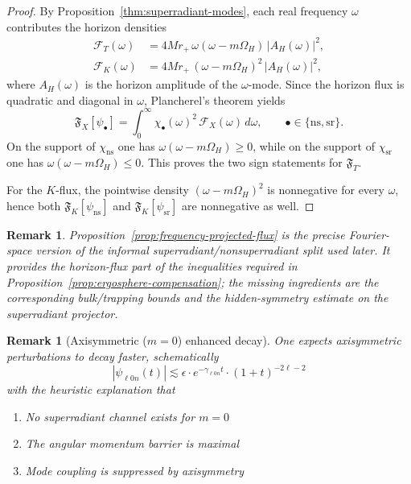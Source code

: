 \documentclass[12pt,a4paper]{article}
\newtheorem{remark}[theorem]{Remark}
\begin{document}
\begin{proof}
By Proposition~\ref{thm:superradiant-modes}, each real frequency $\omega$ contributes the horizon densities
\begin{align}
\mathcal{F}_T(\omega) &= 4Mr_+\,\omega(\omega-m\Omega_H)\,|A_H(\omega)|^2,\\
\mathcal{F}_K(\omega) &= 4Mr_+\,(\omega-m\Omega_H)^2\,|A_H(\omega)|^2,
\end{align}
where $A_H(\omega)$ is the horizon amplitude of the $\omega$-mode. Since the horizon flux is quadratic and diagonal in $\omega$, Plancherel's theorem yields
\begin{equation}
\mathfrak{F}_X[\psi_{\bullet}]
= \int_0^\infty \chi_{\bullet}(\omega)^2\,\mathcal{F}_X(\omega)\,d\omega,
\qquad
\bullet \in \{\mathrm{ns},\mathrm{sr}\}.
\end{equation}
On the support of $\chi_{\mathrm{ns}}$ one has $\omega(\omega-m\Omega_H)\ge 0$, while on the support of $\chi_{\mathrm{sr}}$ one has $\omega(\omega-m\Omega_H)\le 0$. This proves the two sign statements for $\mathfrak{F}_T$.

For the $K$-flux, the pointwise density $(\omega-m\Omega_H)^2$ is nonnegative for every $\omega$, hence both $\mathfrak{F}_K[\psi_{\mathrm{ns}}]$ and $\mathfrak{F}_K[\psi_{\mathrm{sr}}]$ are nonnegative as well.
\end{proof}

\begin{remark}
Proposition~\ref{prop:frequency-projected-flux} is the precise Fourier-space version of the informal superradiant/nonsuperradiant split used later. It provides the horizon-flux part of the inequalities required in Proposition~\ref{prop:ergosphere-compensation}; the missing ingredients are the corresponding bulk/trapping bounds and the hidden-symmetry estimate on the superradiant projector.
\end{remark}

\begin{remark}[Axisymmetric ($m = 0$) enhanced decay]\label{prop:axisymmetric-enhanced}
One expects axisymmetric perturbations to decay faster, schematically
\begin{equation}
|\psi_{\ell 0 n}(t)| \lesssim \epsilon \cdot e^{-\gamma_{\ell 0 n} t} \cdot (1 + t)^{-2\ell - 2}
\end{equation}
with the heuristic explanation that
\begin{enumerate}
    \item No superradiant channel exists for $m = 0$
    \item The angular momentum barrier is maximal
    \item Mode coupling is suppressed by axisymmetry
\end{enumerate}
\end{remark}
\end{document}
